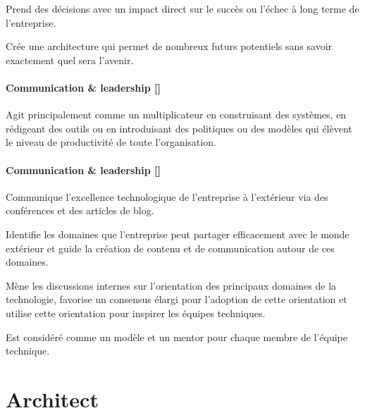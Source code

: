 \documentclass[a4paper, french, openany, 12pt]{book}
\newcommand\cha{\textcolor{RawSienna}{\textbf{Communication \& leadership [\bsc{CHA}]}}}
\begin{document}
\begin{multicols}{2}
  Prend des décisions avec un impact direct sur le succès ou l'échec à long terme de l'entreprise.

  Crée une architecture qui permet de nombreux futurs potentiels sans savoir exactement quel sera l'avenir.

  \subsubsection*{\cha}

  Agit principalement comme un multiplicateur en construisant des systèmes, en rédigeant des outils ou en introduisant 
  des politiques ou des modèles qui élèvent le niveau de productivité de toute l'organisation.

  \subsubsection*{\cha}

  Communique l'excellence technologique de l'entreprise à l'extérieur via des conférences et des articles de blog. 

  Identifie les domaines que l'entreprise peut partager efficacement avec le monde extérieur et guide la création de 
  contenu et de communication autour de ces domaines.

  Mène les discussions internes sur l'orientation des principaux domaines de la technologie, favorise un consensus élargi
  pour l'adoption de cette orientation et utilise cette orientation pour inspirer les équipes techniques.

  Est considéré comme un modèle et un mentor pour chaque membre de l'équipe technique.

\end{multicols}

\chapter{Architect}
\end{document}
